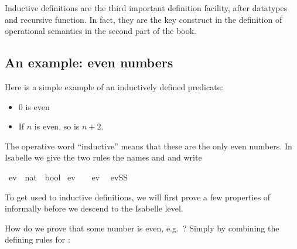 \begin{isabellebody}
\begin{isamarkuptext}
Inductive definitions are the third important definition facility, after
datatypes and recursive function. In fact, they are the key construct in the
definition of operational semantics in the second part of the book.

\subsection{An example: even numbers}
\label{sec:Logic:even}

Here is a simple example of an inductively defined predicate:
\begin{itemize}
\item 0 is even
\item If $n$ is even, so is $n+2$.
\end{itemize}
The operative word ``inductive'' means that these are the only even numbers.
In Isabelle we give the two rules the names  and 
and write%
\end{isamarkuptext}%
\isamarkuptrue%
\isamarkupfalse%
\ ev\ {}{}\ {}nat\ {}\ bool{}\ \isanewline
ev{}{}\ \ \ \ {}ev\ {}{}\ {}\isanewline
evSS{}\ \ %
%
\begin{isamarkuptext}%
To get used to inductive definitions, we will first prove a few
properties of  informally before we descend to the Isabelle level.

How do we prove that some number is even, e.g.\ ? Simply by combining the defining rules for :
\begin{quote}
\end{quote}


\end{isamarkuptext}
\end{isabellebody}

